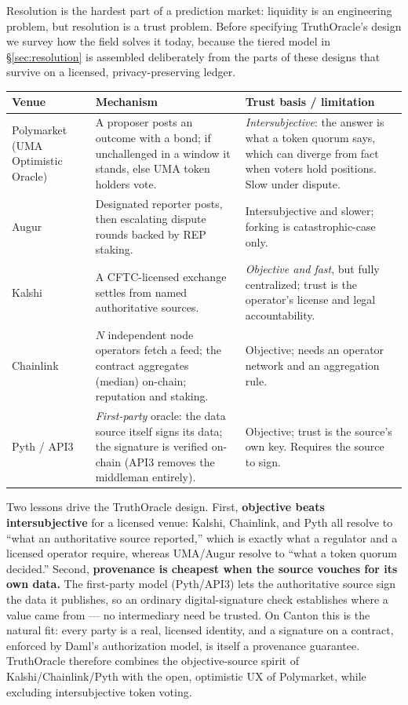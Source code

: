 \documentclass[11pt,a4paper]{article}
\begin{document}
Resolution is the hardest part of a prediction market: liquidity is an engineering problem, but resolution is a trust problem. Before specifying TruthOracle's design we survey how the field solves it today, because the tiered model in \S\ref{sec:resolution} is assembled deliberately from the parts of these designs that survive on a licensed, privacy-preserving ledger.

\begin{center}
\begin{tabular}{p{2.6cm} p{5.2cm} p{5.6cm}}
\toprule
\textbf{Venue} & \textbf{Mechanism} & \textbf{Trust basis / limitation} \\
\midrule
Polymarket (UMA Optimistic Oracle) & A proposer posts an outcome with a bond; if unchallenged in a window it stands, else UMA token holders vote. & \emph{Intersubjective}: the answer is what a token quorum says, which can diverge from fact when voters hold positions. Slow under dispute. \\[4pt]
Augur & Designated reporter posts, then escalating dispute rounds backed by REP staking. & Intersubjective and slower; forking is catastrophic-case only. \\[4pt]
Kalshi & A CFTC-licensed exchange settles from named authoritative sources. & \emph{Objective and fast}, but fully centralized; trust is the operator's license and legal accountability. \\[4pt]
Chainlink & $N$ independent node operators fetch a feed; the contract aggregates (median) on-chain; reputation and staking. & Objective; needs an operator network and an aggregation rule. \\[4pt]
Pyth / API3 & \emph{First-party} oracle: the data source itself signs its data; the signature is verified on-chain (API3 removes the middleman entirely). & Objective; trust is the source's own key. Requires the source to sign. \\
\bottomrule
\end{tabular}
\end{center}

Two lessons drive the TruthOracle design. First, \textbf{objective beats intersubjective} for a licensed venue: Kalshi, Chainlink, and Pyth all resolve to ``what an authoritative source reported,'' which is exactly what a regulator and a licensed operator require, whereas UMA/Augur resolve to ``what a token quorum decided.'' Second, \textbf{provenance is cheapest when the source vouches for its own data.} The first-party model (Pyth/API3) lets the authoritative source sign the data it publishes, so an ordinary digital-signature check establishes where a value came from --- no intermediary need be trusted. On Canton this is the natural fit: every party is a real, licensed identity, and a signature on a contract, enforced by Daml's authorization model, is itself a provenance guarantee. TruthOracle therefore combines the objective-source spirit of Kalshi/Chainlink/Pyth with the open, optimistic UX of Polymarket, while excluding intersubjective token voting.
\end{document}
